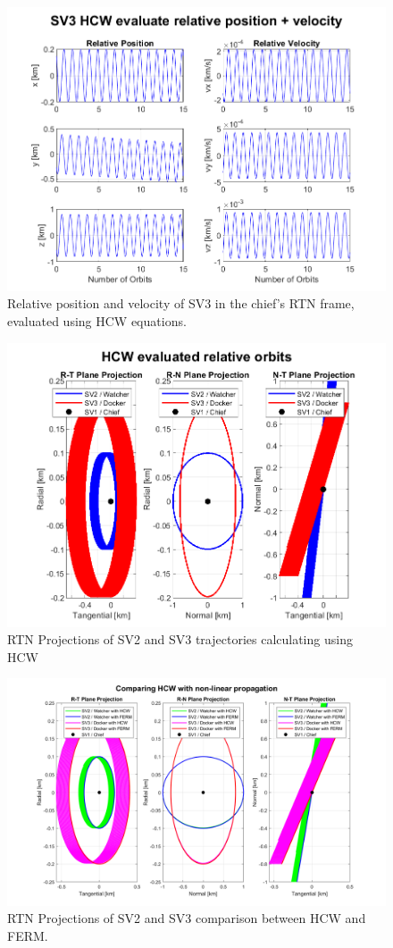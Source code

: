 \begin{figure}[htpb]
    \centering
    \includegraphics[width=0.7\linewidth]{sim/figures/PS3/HCW_pos_vel_SV3.png}
    \caption{Relative position and velocity of SV3 in the chief's RTN frame, evaluated using HCW equations.}
    \label{fig:hcw_sv2_pos_vel}
\end{figure}

\begin{figure}[htpb]
    \centering
    \includegraphics[width=0.7\linewidth]{sim/figures/PS3/RTN_projections_HCW.png}
    \caption{RTN Projections of SV2 and SV3 trajectories calculating using HCW}
    \label{fig:hcw_projections}
\end{figure}

\begin{figure}[htpb]
    \centering
    \includegraphics[width=0.75\linewidth]{sim/figures/PS3/RTN_projections_HCW_comparison.png}
    \caption{RTN Projections of SV2 and SV3 comparison between HCW and FERM.}
    \label{fig:hcw_comparisons_projections}
\end{figure}

